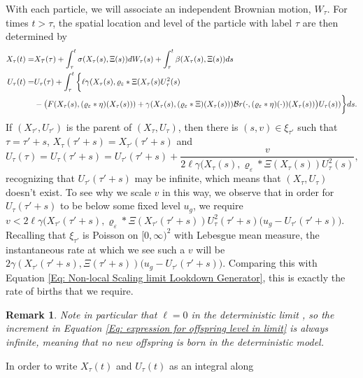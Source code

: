 \documentclass[12pt]{article}
\newtheorem{remark}[theorem]{Remark}
\begin{document}
With each particle, we will 
associate an independent Brownian motion, $W_\tau$. For times 
$t>\tau$, the spatial location and level of the particle with
label $\tau$ are then determined by
\begin{equation}\label{Eq: Expression for dynamics in scaling limit}
\begin{aligned}
X_{\tau}(t)=&X_{\mbox{\rm $\tau$}}(\tau )+\int_{\tau}^t\sigma (X_{
\tau}(s),\Xi (s))dW_{\tau}(s)+\int_{\tau}^t\beta (X_{\tau}(s),\Xi (
s))ds\\
U_{\tau}(t)=&U_{\tau}(\tau )+\int_{\tau}^t\bigg\{\ell \gamma(X_{\tau}(s),\varrho_\varepsilon*\Xi(X_{\tau}(s)U_{\tau}^2(s) \\
& -\big(F(X_{\tau}(s), (\varrho_{\varepsilon}*\eta)(X_{\tau}(s)))+\gamma(X_{\tau}(s), (\varrho_{\varepsilon}*\Xi)(X_{\tau}(s)))\mathcal{B}r(\cdot,(\varrho_{\varepsilon}*\eta)(\cdot))(X_{\tau}(s))\big)U_{\tau}(s))\bigg\}ds.
\end{aligned}
\end{equation}
If $(X_{\tau'},U_{\tau'})$ is the parent of $(X_{\tau},U_{\tau})$, 
then there is $(s,v)\in\xi_{\tau'}$ 
such that $\tau =\tau'+s$,
$X_{\tau}(\tau'+s)=X_{\tau'}(\tau'+s)$ and 
\begin{equation}
\label{Eq: expression for offspring level in limit}
U_{\tau}(\tau )=U_{\tau}(\tau'+s)=U_{\tau'}(\tau'+s)+\frac v{2\ell \gamma(X_{\tau}(s),\varrho_\varepsilon*\Xi(X_{\tau}(s))U_{\tau}^2(s)},
\end{equation} 
recognizing 
that $U_{\tau'}(\tau'+s)$ may be infinite, which means 
that $(X_{\tau}, U_{\tau})$ doesn't exist.
To see why we scale $v$ in this way, 
we observe that
in order for $U_{\tau}(\tau'+s)$ to be below some fixed level $u_g$,
we require 
$v<2\ell \gamma(X_{\tau'}(\tau'+s),\varrho_\varepsilon*\Xi(X_{\tau'}(\tau'+s))U_{\tau}^2(\tau'+s)\big(u_g-U_{\tau'}(\tau'+s)\big)$.
Recalling
that $\xi_{\tau'}$ is Poisson on $[0,\infty)^2$ with Lebesgue mean 
measure, the instantaneous rate at which we see such a $v$ will be
$2\gamma(X_{\tau'}(\tau'+s), \Xi(\tau'+s))\big(u_g-U_{\tau'}(\tau'+s)\big)$.
Comparing  this
with Equation
\eqref{Eq: Non-local Scaling limit Lookdown Generator}, this is exactly
the rate of births that we require.
\begin{remark}
Note in particular that $\ell=0$ in the deterministic limit , so the increment in Equation \eqref{Eq: expression for offspring level in limit} is always infinite, meaning that no new offspring is born in the deterministic model. 
\end{remark}
In order to write $X_\tau(t)$ and $U_\tau(t)$ as an integral along
\end{document}
